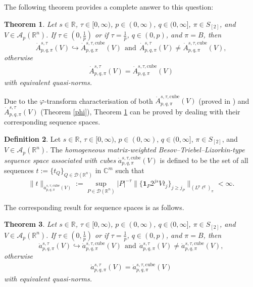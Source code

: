 \documentclass[11pt, reqno]{amsart}
\newtheorem{theorem}{Theorem}[section]
\theoremstyle{definition}
\newtheorem{definition}[theorem]{Definition}
\theoremstyle{remark}
\numberwithin{equation}{section}
\newcommand{\R}{\mathbb R}
\newcommand{\one}{\mathbf{1}}
\begin{document}
The following theorem provides a complete answer to this question:

\begin{theorem}\label{compare A}
Let $s\in\mathbb R$, $\tau\in[0,\infty)$, $p\in(0,\infty)$,
$q\in(0,\infty]$, $\pi\in S_{[2]}$, and $V\in \mathscr A_p(\mathbb R^n)$.
If $\tau\in(0,\frac 1p)$ or if $\tau=\frac 1p$,
$q\in (0,p)$, and $\pi= B$, then
$$
\dot A^{s,\tau}_{p,q,\pi}(V)
\hookrightarrow
\dot A^{s,\tau,\mathrm{cube}}_{p,q,\pi}(V)
\ \ \text{and}\ \
\dot A^{s,\tau}_{p,q,\pi}(V)
\neq \dot A^{s,\tau,\mathrm{cube}}_{p,q,\pi}(V),
$$
otherwise
\begin{align}\label{eqOcube}
\dot A^{s,\tau}_{p,q,\pi}(V)
= \dot A^{s,\tau,\mathrm{cube}}_{p,q,\pi}(V)
\end{align}
with equivalent quasi-norms.
\end{theorem}

Due to the $\varphi$-transform characterisation of both
$\dot A^{s,\tau,\mathrm{cube}}_{p,q,\pi}(V)$ (proved in \cite[Theorem 3.29]{BHYY:1a})
and $\dot A^{s,\tau}_{p,q,\pi}(V)$ (Theorem \ref{phi}),
Theorem \ref{compare A} can be proved by dealing with their corresponding sequence spaces.

\begin{definition}
Let $s\in\mathbb R$, $\tau\in[0,\infty)$,
$p\in(0,\infty)$, $q\in(0,\infty]$, $\pi\in S_{[2]}$,
and $V\in\mathscr A_p(\mathbb R^n)$.
The \emph{homogeneous matrix-weighted Besov--Triebel--Lizorkin-type sequence space associated with cubes}
$\dot a^{s,\tau,\mathrm{cube}}_{p,q,\pi}(V)$
is defined to be the set of all sequences
$t:=\{t_Q\}_{Q\in\mathscr D(\mathbb R^n)}$ in $\mathbb C^m$ such that
\begin{equation*}
\|t\|_{\dot a^{s,\tau,\mathrm{cube}}_{p,q,\pi}(V)}
:=\sup_{P\in\mathscr D(\R^n)} |P|^{-\tau}
\Big\|\Big\{\one_P 2^{js}
V t_j\Big\}_{j\geq j_P}\Big\|_{(L^p\ell^q)_{\pi}}
<\infty.
\end{equation*}
\end{definition}

The corresponding result for sequence spaces is as follows.

\begin{theorem}\label{compare a}
Let $s\in\mathbb R$, $\tau\in[0,\infty)$, $p\in(0,\infty)$,
$q\in(0,\infty]$, $\pi\in S_{[2]}$, and $V\in \mathscr A_p(\mathbb R^n)$.
If $\tau\in(0,\frac 1p)$ or if $\tau=\frac 1p$,
$q\in (0,p)$, and $\pi=B$, then
$$
\dot a^{s,\tau}_{p,q,\pi}(V)
\hookrightarrow
 \dot a^{s,\tau,\mathrm{cube}}_{p,q,\pi}(V)
\ \ \text{and}\ \
\dot a^{s,\tau}_{p,q,\pi}(V)
\neq \dot a^{s,\tau,\mathrm{cube}}_{p,q,\pi}(V),
$$
otherwise
\begin{align}\label{eqcubeO}
\dot a^{s,\tau}_{p,q,\pi}(V)
= \dot a^{s,\tau,\mathrm{cube}}_{p,q,\pi}(V)
\end{align}
with equivalent quasi-norms.
\end{theorem}
\end{document}
